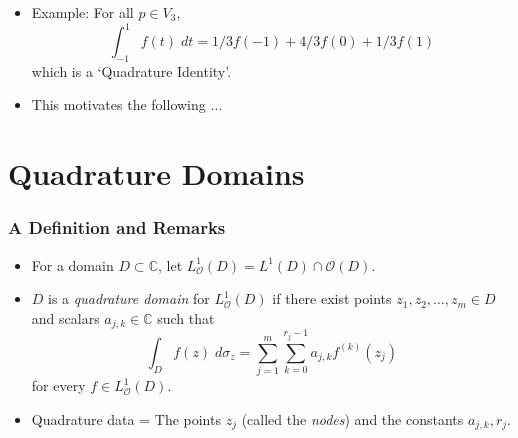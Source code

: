 \documentclass{beamer}
\begin{document}

\begin{frame}

\begin{itemize}

  \item Example: For all $p \in V_3$,
\[
\int_{-1}^1 f(t) \; dt = 1/3 f(-1) + 4/3 f(0) + 1/3 f(1)
\]
which is a `Quadrature Identity'. 

\medskip

  \item This motivates the following $\ldots$
 
\end{itemize}
\end{frame}


\section{Quadrature Domains}

\begin{frame}
  \frametitle{A Definition and Remarks}

\begin{itemize}

 \item For a domain $D \subset \mathbb C$, let $L^1_{\mathcal O}(D) = L^1(D) \cap {\mathcal O}(D)$.

\medskip

 \item $D$ is a {\it quadrature domain} for $L^1_{\mathcal O}(D)$ if there exist points $z_1, z_2, \ldots, z_m \in D$ and scalars $a_{j, k} \in \mathbb C$ such that
\[
\int_D f(z) \; d  \sigma_z = \sum_{j = 1}^m \sum_{k = 0}^{r_j - 1} a_{j, k} f^{(k)}(z_j) 
\]
for every $f \in L^1_{\mathcal O}(D)$.

\medskip

 \item Quadrature data = The points $z_j$ (called the {\it nodes}) and the constants $a_{j, k}, r_j$.


\end{itemize}

\end{frame}
\end{document}
